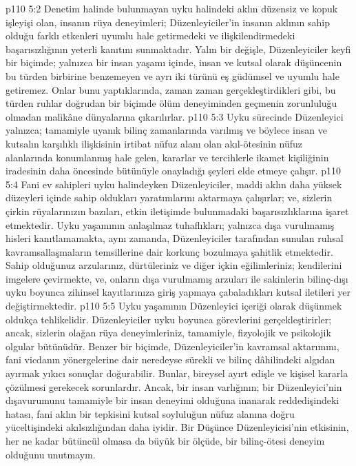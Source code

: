 \vs p110 5:2 Denetim halinde bulunmayan uyku halindeki aklın düzensiz ve kopuk işleyişi olan, insanın rüya deneyimleri; Düzenleyiciler’in insanın aklının sahip olduğu farklı etkenleri uyumlu hale getirmedeki ve ilişkilendirmedeki başarısızlığının yeterli kanıtını sunmaktadır. Yalın bir değişle, Düzenleyiciler keyfi bir biçimde; yalnızca bir insan yaşamı içinde, insan ve kutsal olarak düşüncenin bu türden birbirine benzemeyen ve ayrı iki türünü eş güdümsel ve uyumlu hale getiremez. Onlar bunu yaptıklarında, zaman zaman gerçekleştirdikleri gibi, bu türden ruhlar doğrudan bir biçimde ölüm deneyiminden geçmenin zorunluluğu olmadan malikâne dünyalarına çıkarılırlar.
\vs p110 5:3 Uyku sürecinde Düzenleyici yalnızca; tamamiyle uyanık bilinç zamanlarında varılmış ve böylece insan ve kutsalın karşılıklı ilişkisinin irtibat nüfuz alanı olan akıl\hyp{}ötesinin nüfuz alanlarında konumlanmış hale gelen, kararlar ve tercihlerle ikamet kişiliğinin iradesinin daha öncesinde bütünüyle onayladığı şeyleri elde etmeye çalışır.
\vs p110 5:4 Fani ev sahipleri uyku halindeyken Düzenleyiciler, maddi aklın daha yüksek düzeyleri içinde sahip oldukları yaratımlarını aktarmaya çalışırlar; ve, sizlerin çirkin rüyalarınızın bazıları, etkin iletişimde bulunmadaki başarısızlıklarına işaret etmektedir. Uyku yaşamının anlaşılmaz tuhaflıkları; yalnızca dışa vurulmamış hisleri kanıtlamamakta, aynı zamanda, Düzenleyiciler tarafından sunulan ruhsal kavramsallaşmaların temsillerine dair korkunç bozulmaya şahitlik etmektedir. Sahip olduğunuz arzularınız, dürtüleriniz ve diğer içkin eğilimleriniz; kendilerini imgelere çevirmekte, ve, onların dışa vurulmamış arzuları ile sakinlerin bilinç\hyp{}dışı uyku boyunca zihinsel kayıtlarınıza giriş yapmaya çabaladıkları kutsal iletileri yer değiştirmektedir.
\vs p110 5:5 Uyku yaşamının Düzenleyici içeriği olarak düşünmek oldukça tehlikelidir. Düzenleyiciler uyku boyunca görevlerini gerçekleştirirler; ancak, sizlerin olağan rüya deneyimleriniz, tamamiyle, fizyolojik ve psikolojik olgular bütünüdür. Benzer bir biçimde, Düzenleyiciler’in kavramsal aktarımını, fani vicdanın yönergelerine dair neredeyse sürekli ve bilinç dâhilindeki algıdan ayırmak yıkıcı sonuçlar doğurabilir. Bunlar, bireysel ayırt edişle ve kişisel kararla çözülmesi gerekecek sorunlardır. Ancak, bir insan varlığının; bir Düzenleyici’nin dışavurumunu tamamiyle bir insan deneyimi olduğuna inanarak reddedişindeki hatası, fani aklın bir tepkisini kutsal soyluluğun nüfuz alanına doğru yüceltişindeki akılsızlığından daha iyidir. Bir Düşünce Düzenleyicisi’nin etkisinin, her ne kadar bütüncül olmasa da büyük bir ölçüde, bir bilinç\hyp{}ötesi deneyim olduğunu unutmayın.

